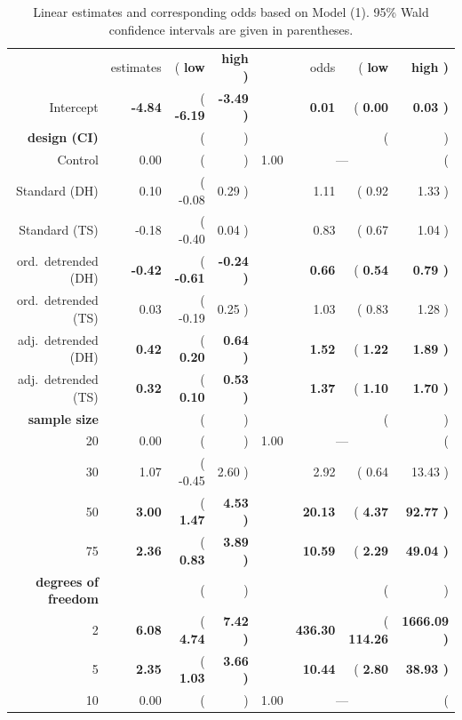 \documentclass[12pt]{article}\usepackage[]{graphicx}\usepackage[]{color}
\begin{document}
% 
% 
\begin{table}[ht]
\caption{\label{tab:coefs} Linear estimates and corresponding odds based on Model (1).  95\% Wald confidence intervals are given in parentheses.}
\centering
\begin{tabular}{rr>{ (}r@{, }r<{) }rr>{ (}r@{, }r<{) }}
\cline{2-4}\cline{6-8}
& estimates & \bf low & \bf high && odds &  \bf low & \bf high \\ 
 \cline{2-4} \cline{6-8}
  Intercept & \bf -4.84 & \bf -6.19 & \bf -3.49 && \bf 0.01 & \bf 0.00 & \bf 0.03 \\ [3pt]
\multicolumn{1}{r}{\bf design (CI)} \\  
Control & 0.00 & \multicolumn{2}{c}{---} && 1.00 & \multicolumn{2}{c}{---}\\
Standard (DH) & 0.10 & -0.08 & 0.29 && 1.11 & 0.92 & 1.33 \\ 
  Standard (TS) & -0.18 & -0.40 & 0.04 && 0.83 & 0.67 & 1.04 \\ [2pt]
%
ord.\ detrended  (DH) & \bf -0.42 & \bf -0.61 & \bf  -0.24 && \bf 0.66 & \bf 0.54 & \bf  0.79 \\ 
ord.\ detrended (TS) & 0.03 & -0.19 & 0.25 && 1.03 & 0.83 & 1.28 \\ [2pt]
%
adj.\ detrended  (DH) & \bf 0.42 & \bf 0.20 & \bf 0.64 && \bf  1.52 & \bf 1.22 & \bf 1.89 \\ 
adj.\ detrended  (TS) & \bf 0.32 & \bf 0.10 & \bf 0.53 && \bf 1.37 & \bf 1.10 & \bf 1.70 \\ [3pt]
\multicolumn{1}{r}{\bf sample size} \\  
20 & 0.00 & \multicolumn{2}{c}{---} && 1.00 & \multicolumn{2}{c}{---}\\
  30 & 1.07 & -0.45 & 2.60 && 2.92 & 0.64 & 13.43 \\ 
  50 & \bf 3.00 & \bf 1.47 & \bf 4.53 && \bf 20.13 & \bf 4.37 & \bf 92.77 \\ 
  75 & \bf 2.36 & \bf 0.83 & \bf 3.89 && \bf 10.59 & \bf 2.29 & \bf 49.04 \\ [3pt]
\multicolumn{1}{r}{\bf degrees of freedom} \\  
 2 & \bf 6.08 & \bf 4.74 & \bf 7.42 && \bf 436.30 & \bf  114.26 & \bf 1666.09 \\ 
 5 & \bf 2.35 & \bf 1.03 & \bf  3.66 && \bf 10.44 & \bf 2.80 & \bf 38.93 \\ 
10 & 0.00 & \multicolumn{2}{c}{---} && 1.00 & \multicolumn{2}{c}{---}\\
\cline{2-4} \cline{6-8}
\end{tabular}
\end{table}
\afterpage{\clearpage}
\end{document}
